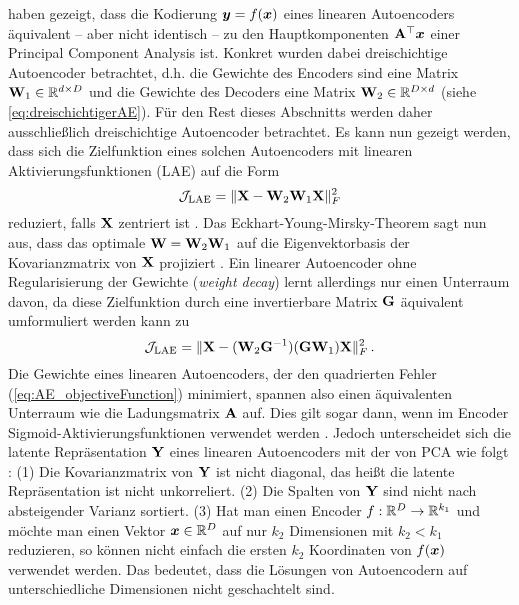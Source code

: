 \textcites{Baldi.1989}{Bourlard.1988} haben gezeigt, dass die Kodierung $\bm{y} = f(\bm{x})$ eines linearen Autoencoders äquivalent -- aber nicht identisch -- zu den Hauptkomponenten $\mathbf{A}^\top\bm{x}$ einer Principal Component Analysis ist. Konkret wurden dabei dreischichtige Autoencoder betrachtet, d.h. die Gewichte des Encoders sind eine Matrix $\mathbf{W}_1 \in \mathbb{R}^{d \times D}$ und die Gewichte des
Decoders eine Matrix $\mathbf{W}_2 \in \mathbb{R}^{D \times d}$ (siehe \eqref{eq:dreischichtigerAE}). Für den Rest dieses Abschnitts werden daher ausschließlich dreischichtige Autoencoder betrachtet. Es kann nun gezeigt werden, dass sich die Zielfunktion eines solchen Autoencoders mit linearen Aktivierungsfunktionen (LAE) auf die Form
\begin{equation}
	\mathcal{J}_{\text{LAE}} = \lVert\mathbf{X} - \mathbf{W}_2\mathbf{W}_1\mathbf{X}\rVert_F^2
\end{equation}
reduziert, falls $\mathbf{X}$ zentriert ist \parencites[Appendix A]{Kunin.2019}[292 -- 293]{Bourlard.1988}. Das Eckhart-Young-Mirsky-Theorem \parencite{Eckart.1936} sagt nun aus, dass das optimale $\mathbf{W} = \mathbf{W}_2 \mathbf{W}_1$ auf die
Eigenvektorbasis der Kovarianzmatrix von $\mathbf{X}$ projiziert \parencite[vgl.][1]{Kunin.2019}. Ein linearer Autoencoder ohne Regularisierung der Gewichte
(\textit{weight decay}) lernt allerdings nur einen Unterraum davon, da diese Zielfunktion durch
eine invertierbare Matrix $\mathbf{G}$ äquivalent umformuliert werden kann zu \parencite[1]{Kunin.2019}
\begin{equation}
	\label{eq:PCA_AE_Unterraum_Inverse}
	\mathcal{J}_{\text{LAE}} = \lVert\mathbf{X} - (\mathbf{W}_2\mathbf{G}^{-1}) (\mathbf{G} \mathbf{W}_1)\mathbf{X}\rVert_F^2 \, .
\end{equation}
Die Gewichte eines linearen Autoencoders, der den quadrierten Fehler
(\eqref{eq:AE_objectiveFunction}) minimiert, spannen also einen äquivalenten Unterraum wie die
Ladungsmatrix $\mathbf{A}$ auf. Dies gilt sogar dann, wenn im Encoder Sigmoid-Aktivierungsfunktionen verwendet werden \parencite[291, 293]{Bourlard.1988}. Jedoch unterscheidet sich die latente Repräsentation $\mathbf{Y}$
eines linearen Autoencoders mit der von PCA wie folgt \parencite[3]{Plaut.2018}: (1) Die Kovarianzmatrix von $\mathbf{Y}$ ist nicht diagonal, das heißt die
latente Repräsentation ist nicht unkorreliert. (2) Die Spalten von $\mathbf{Y}$ sind nicht nach
absteigender Varianz sortiert. (3) Hat man einen Encoder $f: \mathbb{R}^D \rightarrow \mathbb{R}^{k_1}$ und
möchte man einen Vektor $\bm{x} \in \mathbb{R}^D$ auf nur $k_2$ Dimensionen mit $k_2 < k_1$
reduzieren, so können nicht einfach die ersten $k_2$ Koordinaten von $f(\bm{x})$ verwendet
werden. Das bedeutet, dass die Lösungen von Autoencodern auf unterschiedliche Dimensionen nicht
geschachtelt sind.

